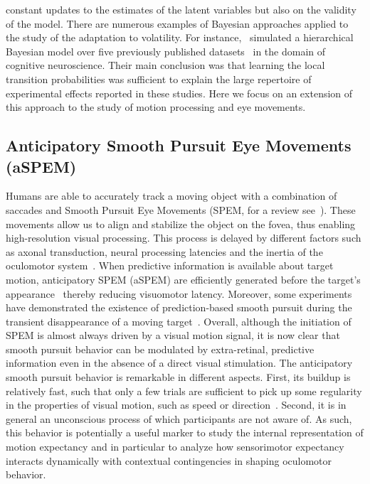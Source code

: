\documentclass[12pt,english]{article}%
\newcommand{\citep}[1]{\parencite{#1}}
\newcommand{\citet}[1]{\textcite{#1}}
\begin{document}
constant updates to the estimates of the latent variables
but also on the validity of the model.
%
There are numerous examples of Bayesian approaches
applied to the study of the adaptation to volatility.
For instance,~\citet{Meyniel16} simulated a hierarchical Bayesian model
over five previously published datasets~\citep{Squires1976, Huettel2002, Kolossa2013, Cho2002, Falk1997} in the domain of cognitive neuroscience.
Their main conclusion was that
learning the local transition probabilities
was sufficient to explain the large repertoire
of experimental effects reported in these studies.
%
Here we focus on an extension of this approach to the study of motion processing and eye movements.
\subsection{Anticipatory Smooth Pursuit Eye Movements (aSPEM)}
Humans are able to accurately track a moving object
with a combination of saccades and
Smooth Pursuit Eye Movements (SPEM, for a review see~\citet{Krauzlis2008}).
These movements allow us to align and
stabilize the object on the fovea,
thus enabling high-resolution visual processing.
This process is delayed by different factors such as axonal transduction,
neural processing latencies and the inertia of the oculomotor system~\citep{Krauzlis89}.
When predictive information is available about target motion,
anticipatory SPEM (aSPEM) are
efficiently generated before the target's appearance~\citep{Westheimer1954, Kowler1979a, Kowler1979b} thereby reducing visuomotor latency.
Moreover, some experiments have demonstrated the existence
of prediction-based smooth pursuit during
the transient disappearance of a moving target~\citep{Badler2006,BeckerFuchs1985,OrbandeXivryMissalLefevre_JOV2012}.
Overall, although the initiation of SPEM is almost always driven by a visual motion signal, it is now clear that smooth pursuit behavior
can be modulated by extra-retinal, predictive information even in the absence of a direct visual stimulation.
The anticipatory smooth pursuit behavior is remarkable
in different aspects.
First, its buildup is relatively fast, such that only a few trials are sufficient
to pick up some regularity in the properties of visual motion, such as speed or direction~\citep{Kowler1984,Maus2015,Deravet_JOV2018}.
Second, it is in general an unconscious process
of which participants are not aware of.
As such, this behavior is potentially a useful marker
to study the internal representation of motion expectancy %
and in particular to analyze how sensorimotor expectancy
interacts dynamically with contextual contingencies in shaping oculomotor behavior.
\end{document}
